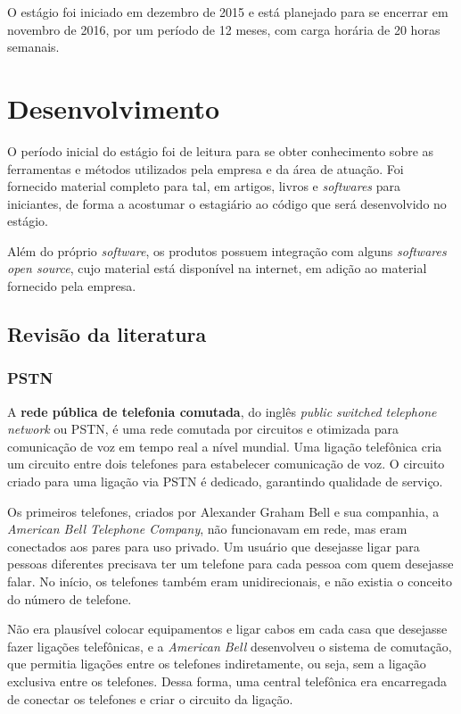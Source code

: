 \documentclass[12pt]{article}
\begin{document}
O estágio foi iniciado em dezembro de 2015 e está planejado para se encerrar em
novembro de 2016, por um período de 12 meses, com carga horária de 20 horas
semanais.

\section{Desenvolvimento}

O período inicial do estágio foi de leitura para se obter conhecimento sobre
as ferramentas e métodos utilizados pela empresa e da área de atuação. Foi
fornecido material completo para tal, em artigos, livros e \textit{softwares}
para iniciantes, de forma a acostumar o estagiário ao código que será
desenvolvido no estágio.

Além do próprio \textit{software}, os produtos possuem integração com alguns
\textit{softwares open source}, cujo material está disponível na internet, em
adição ao material fornecido pela empresa.

\subsection{Revisão da literatura}

\subsubsection{PSTN}

A \textbf{rede pública de telefonia comutada}, do inglês
\textit{public switched telephone network} ou PSTN, é uma rede comutada por
circuitos e otimizada para comunicação de voz em tempo real a nível mundial.
Uma ligação telefônica cria um circuito entre dois telefones para estabelecer
comunicação de voz. O circuito criado para uma ligação via PSTN é dedicado,
garantindo qualidade de serviço.

Os primeiros telefones, criados por Alexander Graham Bell e sua companhia, a
\textit{American Bell Telephone Company}, não funcionavam em rede, mas eram
conectados aos pares para uso privado. Um usuário que desejasse ligar para
pessoas diferentes precisava ter um telefone para cada pessoa com quem
desejasse falar. No início, os telefones também eram unidirecionais, e não
existia o conceito do número de telefone.

Não era plausível colocar equipamentos e ligar cabos em cada casa que desejasse
fazer ligações telefônicas, e a \textit{American Bell} desenvolveu o sistema de
comutação, que permitia ligações entre os telefones indiretamente, ou seja, sem
a ligação exclusiva entre os telefones. Dessa forma, uma central telefônica era
encarregada de conectar os telefones e criar o circuito da ligação.
\end{document}
